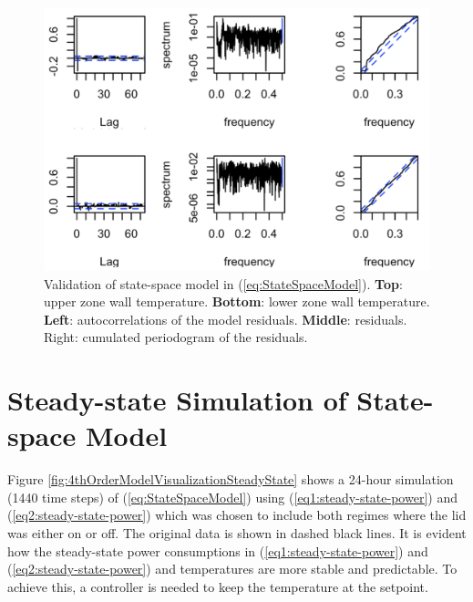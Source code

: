 \documentclass[sigconf]{acmart}
\begin{document}
\begin{figure}[t]
    \centering
    \includegraphics[width=\columnwidth]{figures/4thOrderModelValidation_V2.png}
    \caption{Validation of state-space model in (\ref{eq:StateSpaceModel}). \textbf{Top}: upper zone wall temperature. \textbf{Bottom}: lower zone wall temperature. \textbf{Left}: autocorrelations of the model residuals. \textbf{Middle}: residuals. \textrm{Right}: cumulated periodogram of the residuals.}
    \label{fig:4thOrderModelValidation}
\end{figure}

\section{Steady-state Simulation of State-space Model}\label{app:steady-state-simulation}


Figure \ref{fig:4thOrderModelVisualizationSteadyState} shows a 24-hour simulation (1440 time steps) of (\ref{eq:StateSpaceModel}) using (\ref{eq1:steady-state-power}) and (\ref{eq2:steady-state-power}) which was chosen to include both regimes where the lid was either on or off. The original data is shown in dashed black lines. It is evident how the steady-state power consumptions in (\ref{eq1:steady-state-power}) and (\ref{eq2:steady-state-power}) and temperatures are  more stable and predictable. To achieve this, a controller is needed to keep the temperature at the setpoint.
\end{document}
